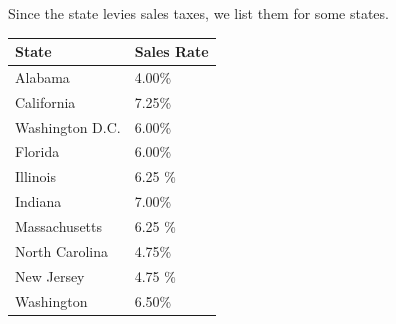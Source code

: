 \documentclass{article}
\begin{document}
    \begin{example}
      \label{ex:2020-sales-taxes-by-state}
      Since the state levies sales taxes, we list them for some states. 
      \begin{center}
      \begin{tabular}{l|l}
          State & Sales Rate \\
          \hline
          Alabama & 4.00\% \\
          California & 7.25\% \\
          Washington D.C. & 6.00\% \\
          Florida & 6.00\% \\
          Illinois & 6.25 \%\\
          Indiana & 7.00\%\\
          Massachusetts & 6.25 \%\\
          North Carolina & 4.75\%\\
          New Jersey & 4.75 \%\\
          Washington & 6.50\%
      \end{tabular}
      \end{center}
    \end{example}
\end{document}
